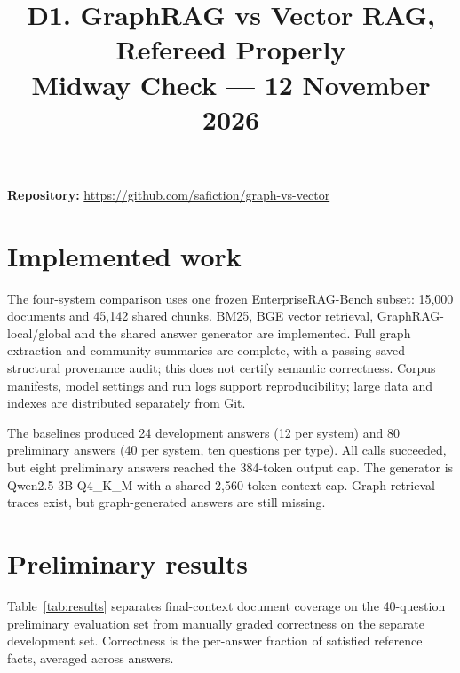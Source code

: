 \documentclass[conference]{IEEEtran}
\begin{document}
\title{D1. GraphRAG vs Vector RAG, Refereed Properly\\Midway Check --- 12 November 2026}

\author{
\and
{}
\and
{}
}

\maketitle

\noindent\textbf{Repository:} \url{https://github.com/safiction/graph-vs-vector}

\section{Implemented work}
The four-system comparison uses one frozen EnterpriseRAG-Bench subset:
15,000 documents and 45,142 shared chunks. BM25, BGE vector retrieval,
GraphRAG-local/global and the shared answer generator are implemented.
Full graph extraction and community summaries are complete, with a passing
saved structural provenance audit; this does not certify semantic correctness.
Corpus manifests, model settings and run logs support reproducibility;
large data and indexes are distributed separately from Git.

The baselines produced 24 development answers (12 per system) and 80
preliminary answers (40 per system, ten questions per type). All calls
succeeded, but eight preliminary answers reached the 384-token output cap.
The generator is Qwen2.5 3B Q4\_K\_M with a shared 2,560-token context cap.
Graph retrieval traces exist, but graph-generated answers are still missing.

\section{Preliminary results}
Table~\ref{tab:results} separates final-context document coverage on the
40-question preliminary evaluation set from manually graded correctness on
the separate development set. Correctness is the per-answer fraction of
satisfied reference facts, averaged across answers.
\end{document}
